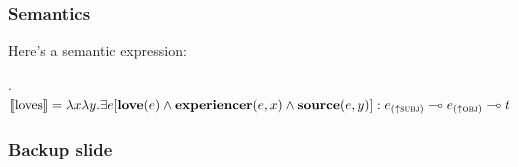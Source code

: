 \documentclass[
11pt,
]{beamer}
\begin{document}
\begin{frame}
  \frametitle{Semantics}
  Here's a semantic expression:

  \ex.
  $\llbracket \textnormal{loves} \rrbracket = \lambda x \lambda y. \exists e[\mathbf{love}(e) \land \mathbf{experiencer}(e,x) \land \mathbf{source}(e,y)] : e_{(\uparrow \textsc{subj})} \multimap e_{(\uparrow \textsc{obj})} \multimap t$

\end{frame}





\appendix

\begin{frame}
  \frametitle{Backup slide}

\end{frame}
\end{document}
